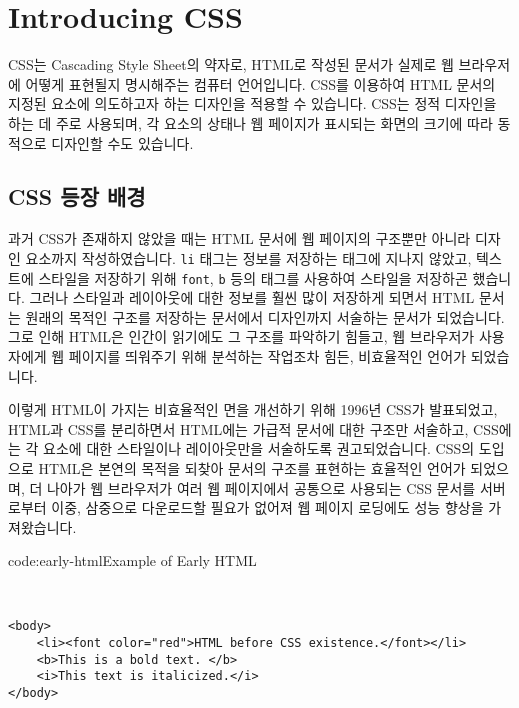 \section{Introducing CSS} \label{sect:introducing-css}

CSS는 Cascading Style Sheet의 약자로, HTML로 작성된 문서가 실제로 웹 브라우저에 어떻게 표현될지 명시해주는 컴퓨터 언어입니다. CSS를 이용하여 HTML 문서의 지정된 요소에 의도하고자 하는 디자인을 적용할 수 있습니다. CSS는 정적 디자인을 하는 데 주로 사용되며, 각 요소의 상태나 웹 페이지가 표시되는 화면의 크기에 따라 동적으로 디자인할 수도 있습니다. 

\subsection*{CSS 등장 배경}
과거 CSS가 존재하지 않았을 때는 HTML 문서에 웹 페이지의 구조뿐만 아니라 디자인 요소까지 작성하였습니다. \verb|li| 태그는 정보를 저장하는 태그에 지나지 않았고, 텍스트에 스타일을 저장하기 위해 \verb|font|, \verb|b| 등의 태그를 사용하여 스타일을 저장하곤 했습니다. 그러나 스타일과 레이아웃에 대한 정보를 훨씬 많이 저장하게 되면서 HTML 문서는 원래의 목적인 구조를 저장하는 문서에서 디자인까지 서술하는 문서가 되었습니다. 그로 인해 HTML은 인간이 읽기에도 그 구조를 파악하기 힘들고, 웹 브라우저가 사용자에게 웹 페이지를 띄워주기 위해 분석하는 작업조차 힘든, 비효율적인 언어가 되었습니다. 

이렇게 HTML이 가지는 비효율적인 면을 개선하기 위해 1996년 CSS가 발표되었고, HTML과 CSS를 분리하면서 HTML에는 가급적 문서에 대한 구조만 서술하고, CSS에는 각 요소에 대한 스타일이나 레이아웃만을 서술하도록 권고되었습니다. CSS의 도입으로 HTML은 본연의 목적을 되찾아 문서의 구조를 표현하는 효율적인 언어가 되었으며, 더 나아가 웹 브라우저가 여러 웹 페이지에서 공통으로 사용되는 CSS 문서를 서버로부터 이중, 삼중으로 다운로드할 필요가 없어져 웹 페이지 로딩에도 성능 향상을 가져왔습니다.

\begin{codeenv}{code:early-html}{Example of Early HTML}\begin{verbatim}


<body>
    <li><font color="red">HTML before CSS existence.</font></li>
    <b>This is a bold text. </b>
    <i>This text is italicized.</i>
</body>
\end{verbatim}
\end{codeenv}
